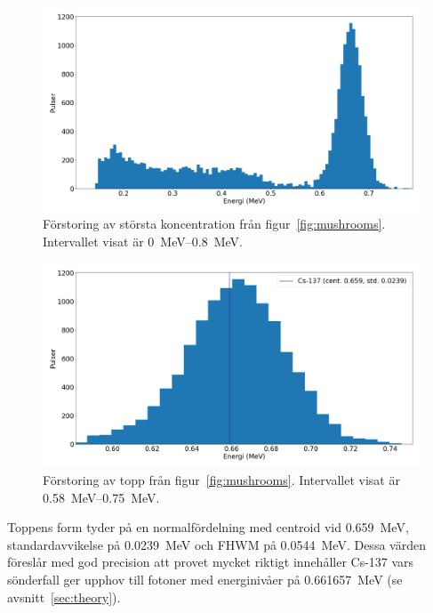 \begin{figure}[!hp]
    \centering
    \includegraphics[width=\textwidth, keepaspectratio]{../images/mushrooms_zoom.png}
    \caption{
        Förstoring av största koncentration från figur~\ref{fig:mushrooms}.
        Intervallet visat är \qtyrange{0}{0.8}{\MeV}.
    }
    \label{fig:mushroomszoom}
\end{figure}

\begin{figure}[!hp]
    \centering
    \includegraphics[width=\textwidth, keepaspectratio]{../images/mushrooms_top.png}
    \caption{
        Förstoring av topp från figur~\ref{fig:mushrooms}.
        Intervallet visat är \qtyrange{0.58}{0.75}{\MeV}.
    }
    \label{fig:mushroomstop}
\end{figure}

Toppens form tyder på en normalfördelning med centroid vid \qty{0.659}{\MeV},
standardavvikelse på \qty{0.0239}{\MeV} och FHWM på \qty{0.0544}{\MeV}. Dessa
värden föreslår med god precision att provet mycket riktigt innehåller Cs-137
vars sönderfall ger upphov till fotoner med energinivåer på
\qty{0.661657}{\MeV} (se avsnitt~\ref{sec:theory}).


